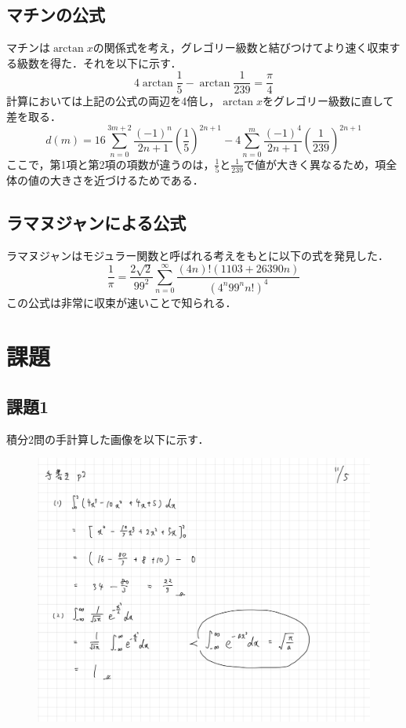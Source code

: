 \documentclass[a4paper, titlepage]{jsarticle}
\begin{document}
	\subsection{マチンの公式}
	マチンは$\arctan{x}$の関係式を考え，グレゴリー級数と結びつけてより速く収束する級数を得た．それを以下に示す．
		\begin{equation}
			4\arctan\frac{1}{5}-\arctan\frac{1}{239}=\frac{\pi}{4}
		\end{equation}
	計算においては上記の公式の両辺を4倍し，$\arctan{x}$をグレゴリー級数に直して差を取る．
		\begin{equation}
			d(m)=16\sum_{n=0}^{3m+2}\frac{(-1)^n}{2n+1}\left(\frac{1}{5}\right)^{2n+1}-4\sum_{n=0}^{m}\frac{(-1)^4}{2n+1}\left(\frac{1}{239}\right)^{2n+1}
		\end{equation}
	ここで，第1項と第2項の項数が違うのは，$\frac{1}{5}$と$\frac{1}{239}$で値が大きく異なるため，項全体の値の大きさを近づけるためである．
	
	\subsection{ラマヌジャンによる公式}
	ラマヌジャンはモジュラー関数と呼ばれる考えをもとに以下の式を発見した．
		\begin{equation}
			\frac{1}{\pi}=\frac{2\sqrt{2}}{99^2}\sum_{n=0}^{\infty}\frac{(4n)!(1103+26390n)}{(4^{n}99^{n}n!)^4}
		\end{equation}
	この公式は非常に収束が速いことで知られる．

	\section{課題}
	\subsection{課題1}
	積分2問の手計算した画像を以下に示す．
		\begin{figure}[ht]
			\centering
			\includegraphics[keepaspectratio, scale=0.2]{File_001.png}
		\end{figure}
\end{document}
